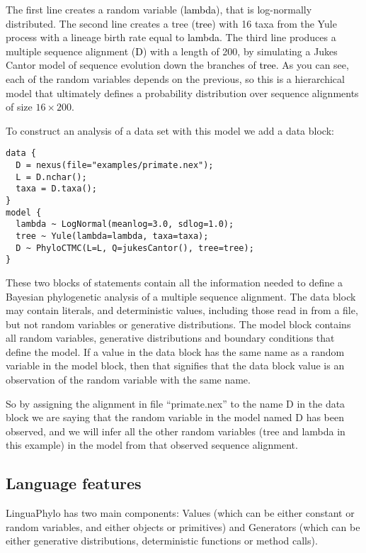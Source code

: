 \documentclass[oneside]{article}
\renewcommand{\texttt}[2][black]{\textcolor{#1}{\ttfamily #2}}%
\begin{document}
The first line creates a random variable (\texttt{lambda}), that is
log-normally distributed.
The second line creates a tree (\texttt{tree}) with 16 taxa from the
Yule process with a lineage birth rate equal to \texttt{lambda}.
The third line produces a multiple sequence alignment (\texttt{D})
with a length of 200, by simulating a Jukes Cantor model of sequence
evolution down the branches of  \texttt{tree}.
As you can see, each of the random variables depends on the previous,
so this is a hierarchical model that ultimately defines a probability
distribution over sequence alignments of size $16 \times 200$.

To construct an analysis of a data set with this model we add a data block:

{\singlespacing
\begin{verbatim}
data {
  D = nexus(file="examples/primate.nex");
  L = D.nchar();
  taxa = D.taxa();
}
model {
  lambda ~ LogNormal(meanlog=3.0, sdlog=1.0);
  tree ~ Yule(lambda=lambda, taxa=taxa);
  D ~ PhyloCTMC(L=L, Q=jukesCantor(), tree=tree);
}
\end{verbatim}
}

These two blocks of statements contain all the information needed to define
a Bayesian phylogenetic analysis of a multiple sequence alignment.
The data block may contain literals, and deterministic values, including those read in from a file, but not random variables or generative distributions.
The model block contains all random variables, generative distributions and boundary conditions that define the model.
If a value in the data block has the same name as a random variable in the model block, then that signifies that the data block value is an observation of the random variable with the same name.


So by assigning the alignment in file
``primate.nex'' to the name D in the data block we are saying that the random variable in the model named D has
been observed, and we will infer all the other random variables
(tree and lambda in this example) in the model from that observed sequence alignment.

\subsection{Language features}

LinguaPhylo has two main components: Values (which can be either constant or random variables, and either objects or primitives) and Generators (which can be either generative distributions, deterministic functions or method calls).
\end{document}
